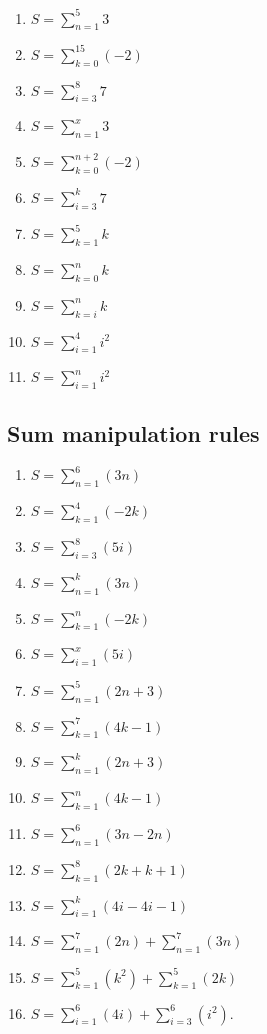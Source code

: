\documentclass{article}
\begin{document}
\begin{enumerate}

    \item $ S = \sum_{n=1}^{5} 3 $
    \item $ S = \sum_{k=0}^{15} (-2) $
    \item $ S = \sum_{i=3}^{8} 7 $
    \item $ S = \sum_{n=1}^{x} 3 $
    \item $ S = \sum_{k=0}^{n+2} (-2) $
    \item $ S = \sum_{i=3}^{k} 7 $
    \item $ S = \sum_{k=1}^{5} k$ 
    \item $ S = \sum_{k=0}^{n} k$
    \item $ S = \sum_{k=i}^{n} k$
    \item $ S = \sum_{i=1}^{4} i^2$
    \item $ S = \sum_{i=1}^{n} i^2 $
    
\end{enumerate}

\subsection{Sum manipulation rules}

\begin{enumerate}
    \item \(S = \sum_{n=1}^{6} (3n)\)
    \item \(S = \sum_{k=1}^{4} (-2k)\)
    \item \(S = \sum_{i=3}^{8} (5i)\)
    \item \(S = \sum_{n=1}^{k} (3n)\)
    \item \(S= \sum_{k=1}^{n} (-2k)\)
    \item \(S = \sum_{i=1}^{x} (5i)\)
    \item \(S = \sum_{n=1}^{5} (2n + 3)\)
    \item \(S = \sum_{k=1}^{7} (4k - 1)\)
    \item \(S = \sum_{n=1}^{k} (2n + 3)\)
    \item \(S = \sum_{k=1}^{n} (4k - 1)\)
    \item \(S = \sum_{n=1}^{6} (3n - 2n)\)
    \item \(S = \sum_{k=1}^{8} (2k + k+1)\)
    \item \(S = \sum_{i=1}^{k} (4i - 4i-1)\)
    \item \(S = \sum_{n=1}^{7} (2n) + \sum_{n=1}^{7} (3n)\)
    \item \(S = \sum_{k=1}^{5} (k^2) + \sum_{k=1}^{5} (2k)\)
    \item \(S = \sum_{i=1}^{6} (4i) + \sum_{i=3}^{6} (i^2)\).
\end{enumerate}
\end{document}
